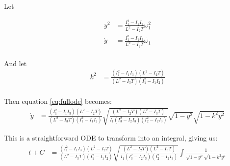 \documentclass[a4paper, 12pt]{article}
\begin{document}
Let

\begin{align}
  y^2 &= \frac{I_1^2 - I_1I_2}{L^2 - I_2T}\omega_1^2 \\
  \dot{y} &= \frac{I_1^2 - I_1I_2}{L^2 - I_2T}\dot{\omega_1} \\
\end{align}

And let
\begin{align}
  k^2 & = \frac{(I_1^2 - I_1I_3)(L^2 - I_2T)}{(L^2 - I_3T)(I_1^2 - I_1I_2)} \\  
\end{align}

Then equation \ref{eq:fullode} becomes:
\begin{align}
  \dot{y}&=\frac{(I_1^2 - I_1I_3)(L^2 - I_2T)}{(L^2 - I_3T)(I_1^2 - I_1I_2)}\sqrt{\frac{(L^2 - I_2T)(L^2 - I_3T)}{I_1(I_3^2 - I_2I_3)(I_2^2 - I_2I_3)}}\sqrt{ 1 - y^2}\sqrt{ 1 - k^2y^2}
\end{align}

This is a straightforward ODE to transform into an integral, giving us:
\begin{align}
  t + C &=\frac{(I_1^2 - I_1I_3)(L^2 - I_2T)}{(L^2 - I_3T)(I_1^2 - I_1I_2)}\sqrt{\frac{(L^2 - I_2T)(L^2 - I_3T)}{I_1(I_3^2 - I_2I_3)(I_2^2 - I_2I_3)}}\int\frac{1}{\sqrt{ 1 - y^2}\sqrt{ 1 - k^2y^2}}
\end{align}
\end{document}

